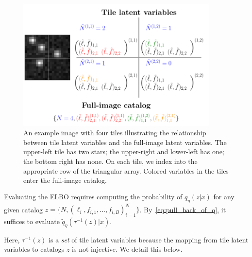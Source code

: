 \begin{figure}[!ht]
    \centering
    \includegraphics[width = 0.9\textwidth]{figures/tile_to_full_schematic.png}
    \caption{An example image with four tiles illustrating the relationship between tile latent variables and the full-image latent variables. The upper-left tile has two stars; the upper-right and lower-left has one; the bottom right has none. 
    On each tile, we index into the appropriate row of the triangular array. 
    Colored variables in the tiles enter the full-image catalog.}
    \label{fig:tile_to_full_schm}
\end{figure}




\noindent Evaluating
the ELBO requires computing the probability of 
$q_\eta(z | x)$
for any given catalog $z = \{N, (\ell_i, f_{i,1}, ..., f_{i,B})_{i = 1}^N\}$. 
By~\eqref{eq:pull_back_of_q}, 
it suffices to evaluate $\tilde q_\eta(\tau^{-1}(z) | x)$. 

Here, $\tau^{-1}(z)$ is a {\itshape set} of tile latent variables because the mapping from tile latent variables to catalogs $z$ is not injective. We detail this below. 

